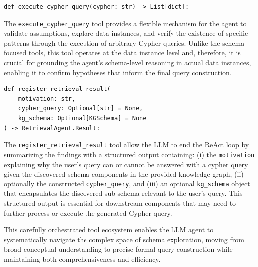 %
\begin{verbatim}
def execute_cypher_query(cypher: str) -> List[dict]:
\end{verbatim}
%
The \verb|execute_cypher_query| tool provides a flexible mechanism for the agent to validate assumptions, explore data instances, and verify the existence of specific patterns through the execution of arbitrary Cypher queries. Unlike the schema-focused tools, this tool operates at the data instance level and, therefore, it is crucial for grounding the agent's schema-level reasoning in actual data instances, enabling it to confirm hypotheses that inform the final query construction. %
%
%
\begin{verbatim}
def register_retrieval_result(
    motivation: str,
    cypher_query: Optional[str] = None,
    kg_schema: Optional[KGSchema] = None
) -> RetrievalAgent.Result:
\end{verbatim}
%
The \verb|register_retrieval_result| tool allow the LLM to end the ReAct loop by summarizing the findings with a structured output containing: (i) the \verb|motivation| explaining why the user's query can or cannot be answered with a cypher query given the discovered schema components in the provided knowledge graph, (ii) optionally the constructed \verb|cypher_query|, and (iii) an optional \verb|kg_schema| object that encapsulates the discovered sub-schema relevant to the user's query. This structured output is essential for downstream components that may need to further process or execute the generated Cypher query.

This carefully orchestrated tool ecosystem enables the LLM agent to systematically navigate the complex space of schema exploration, moving from broad conceptual understanding to precise formal query construction while maintaining both comprehensiveness and efficiency.

